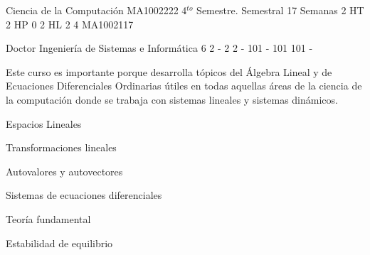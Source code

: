 \documentclass[a4paper,8pt]{article}
\begin{document}
\setNombreProfesor{}
\setGradoProfesorAbreviado{}
\sylabusHeader

\academicaTable
{Ciencia de la Computación} %
{MA1002222} %
{4$^{to}$ Semestre.} %
{Semestral} %
{17 Semanas} %
{2 HT} %
{2 HP} %
{0} %
{2 HL}  %
{2} %
{4} %
{MA1002117} %

\administrativaTable
{Doctor} %
{Ingeniería de Sistemas e Informática} %
{6} %
{2} %
{-} %
{2} %
{2} %
{-} %
{101} %
{-} %
{101} %
{101} %
{-} %


\begin{fundamentacion}
Este curso es importante porque desarrolla tópicos del Álgebra Lineal y de Ecuaciones Diferenciales Ordinarias útiles en todas aquellas áreas de la ciencia de la computación donde se trabaja con sistemas lineales y sistemas dinámicos.

\end{fundamentacion}

\begin{sumilla}
\item Espacios Lineales
\item Transformaciones lineales
\item Autovalores y autovectores
\item Sistemas de ecuaciones diferenciales
\item Teoría fundamental
\item Estabilidad de equilibrio

\end{sumilla}

\begin{competenciasAsignatura}
\item {}

\end{competenciasAsignatura}
\end{document}
